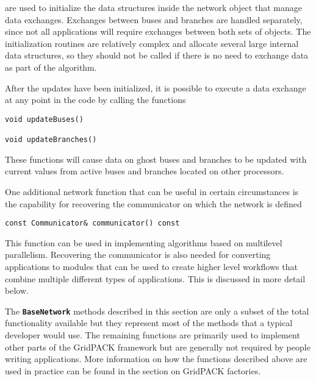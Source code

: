 are used to initialize the data structures inside the network object that manage data exchanges. Exchanges between buses and branches are handled separately, since not all applications will require exchanges between both sets of objects. The initialization routines are relatively complex and allocate several large internal data structures, so they should not be called if there is no need to exchange data as part of the algorithm.

After the updates have been initialized, it is possible to execute a data exchange at any point in the code by calling the functions

{
\color{red}
\begin{Verbatim}[fontseries=b]
void updateBuses()

void updateBranches()
\end{Verbatim}
}

These functions will cause data on ghost buses and branches to be updated with current values from active buses and branches located on other processors.

One additional network function that can be useful in certain circumstances is the capability for recovering the communicator on which the network is defined

{
\color{red}
\begin{Verbatim}[fontseries=b]
const Communicator& communicator() const
\end{Verbatim}
}

This function can be used in implementing algorithms based on multilevel parallelism. Recovering the communicator is also needed for converting applications to modules that can be used to create higher level workflows that combine multiple different types of applications. This is discussed in more detail below.

The \texttt{\textbf{BaseNetwork}} methods described in this section are only a subset of the total functionality available but they represent most of the methods that a typical developer would use. The remaining functions are primarily used to implement other parts of the GridPACK framework but are generally not required by people writing applications. More information on how the functions described above are used in practice can be found in the section on GridPACK factories.
